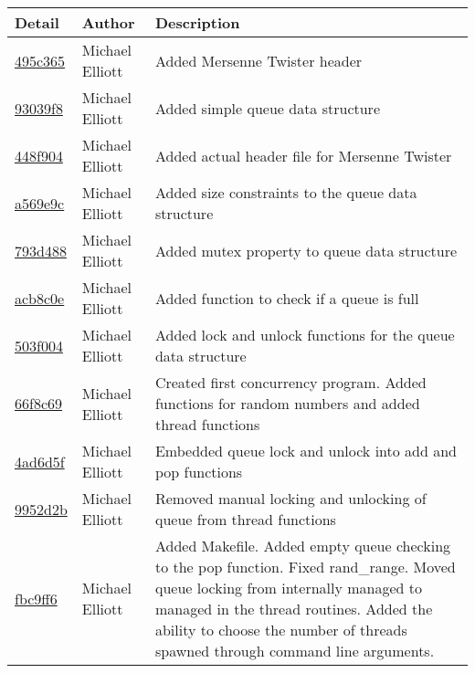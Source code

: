 \documentclass[letterpaper,10pt,titlepage,draftclsnofoot,onecolumn]{IEEEtran}
\begin{document}
\begin{tabular}{l l l}\textbf{Detail} & \textbf{Author} & \textbf{Description}\\\hline
\href{https://github.com/elliomic/CS-444/commit/495c3654bd7736ea43c6a88eb59743eab5e64695}{495c365} & Michael Elliott & Added Mersenne Twister header\\\hline
\href{https://github.com/elliomic/CS-444/commit/93039f88419ac754dcbd9f5e86c4acc2ae075c92}{93039f8} & Michael Elliott & Added simple queue data structure\\\hline
\href{https://github.com/elliomic/CS-444/commit/448f904d4299eed4f7290557a7dd2ed03a731583}{448f904} & Michael Elliott & Added actual header file for Mersenne Twister\\\hline
\href{https://github.com/elliomic/CS-444/commit/a569e9c76e5f3b7d77a61959641102f75df9826e}{a569e9c} & Michael Elliott & Added size constraints to the queue data structure\\\hline
\href{https://github.com/elliomic/CS-444/commit/793d488cb52123a48e8d345293ce4359e2c301c1}{793d488} & Michael Elliott & Added mutex property to queue data structure\\\hline
\href{https://github.com/elliomic/CS-444/commit/acb8c0e69e610e33efc6d0764caa3ccc66a663d9}{acb8c0e} & Michael Elliott & Added function to check if a queue is full\\\hline
\href{https://github.com/elliomic/CS-444/commit/503f004502547d608cf63b7cd5b60aad8b3ab3f7}{503f004} & Michael Elliott & Added lock and unlock functions for the queue data structure\\\hline
\href{https://github.com/elliomic/CS-444/commit/66f8c69f4b2b4122718aad4f72a9eeadd9e06545}{66f8c69} & Michael Elliott & Created first concurrency program. Added functions for random numbers and added thread functions\\\hline
\href{https://github.com/elliomic/CS-444/commit/4ad6d5f2f7a954616d7a38cb8cecd9c26fc3c5f3}{4ad6d5f} & Michael Elliott & Embedded queue lock and unlock into add and pop functions\\\hline
\href{https://github.com/elliomic/CS-444/commit/9952d2b8061cbde3abc5e0b6fb4430c04aaa28e7}{9952d2b} & Michael Elliott & Removed manual locking and unlocking of queue from thread functions\\\hline
\href{https://github.com/elliomic/CS-444/commit/fbc9ff6fcc38d42815a70a9a0efff13171a768ac}{fbc9ff6} & Michael Elliott & Added Makefile. Added empty queue checking to the pop function. Fixed rand_range. Moved queue locking from internally managed to managed in the thread routines. Added the ability to choose the number of threads spawned through command line arguments.\\\hline

\end{tabular}
\end{document}
